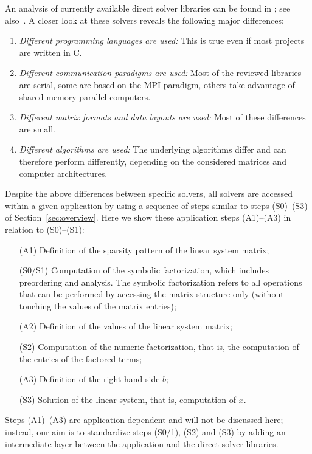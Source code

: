 \documentclass[acmtoms,acmnow]{acmtrans2m}
\begin{document}
An analysis of currently available direct solver libraries can be found
in \cite{davis05summary}; see also~\cite[Section 6.7]{dongarra98numerical}.
A closer look at these solvers reveals the following major
differences:
\begin{enumerate}
\item {\sl Different programming languages are used:} This is true even if most projects are
written in C.

\item {\sl Different communication paradigms are used:}
 Most of the reviewed libraries are serial, some are based on the MPI
 paradigm, others take advantage of shared memory parallel computers.

\item {\sl Different matrix formats and data layouts are used:}
Most of these differences are small.

\item {\sl Different algorithms are used:} The underlying algorithms differ
and can therefore perform differently, depending on the considered matrices and
computer architectures.

\end{enumerate}

Despite the above differences between specific solvers, all solvers
are accessed within a given application by using a sequence of steps
similar to steps (S0)--(S3) of Section~\ref{sec:overview}.  Here we
show these application steps (A1)--(A3) in relation to (S0)--(S1):
\begin{enumerate}
\item[(A1)] Definition of the sparsity pattern of the linear system matrix;
\item[(S0/S1)] Computation of the symbolic factorization, which includes
preordering and analysis. The
symbolic factorization refers to all operations that can be performed by
accessing the matrix structure only (without touching the values of the matrix entries);
\item[(A2)] Definition of the values of the linear system matrix;
\item[(S2)] Computation of the numeric factorization, that is, the computation
of the entries of the factored terms;
\item[(A3)] Definition of the right-hand side $b$;
\item[(S3)] Solution of the linear system, that is, computation of $x$.
\end{enumerate}
Steps (A1)--(A3) are application-dependent and will not be discussed
here; instead, our aim is to standardize steps (S0/1), (S2) and (S3)
by adding an intermediate layer between the application and the
direct solver libraries.
\end{document}
